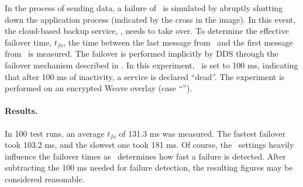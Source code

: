 In the process of sending data, a failure of \proda\ is simulated by abruptly shutting down the application process (indicated by the cross in the image). In this event, the cloud-based backup service, \prodb , needs to take over. To determine the effective failover time, $t_{fo}$, the time between the last message from \proda\ and the first message from \prodb\ is measured. The failover is performed implicitly by DDS through the failover mechanism described in . In this experiment, \liveliness\ is set to 100 ms, indicating that after 100 ms of inactivity, a service is declared ``dead''. The experiment is performed on an encrypted Weave overlay (case ``'').



\paragraph{Results.} In 100 test runs, an average $t_{fo}$ of 131.3 ms was measured. The fastest failover took 103.2 ms, and the slowest one took 181 ms. Of course, the \liveliness\ settings heavily influence the failover times as \liveliness\ determines how fast a failure is detected. After subtracting the 100 ms needed for failure detection, the resulting figures may be considered reasonable.
%
%
%
%
%
%
%
%
%
%
%
%
%
%
%
%
%
%
%
%
